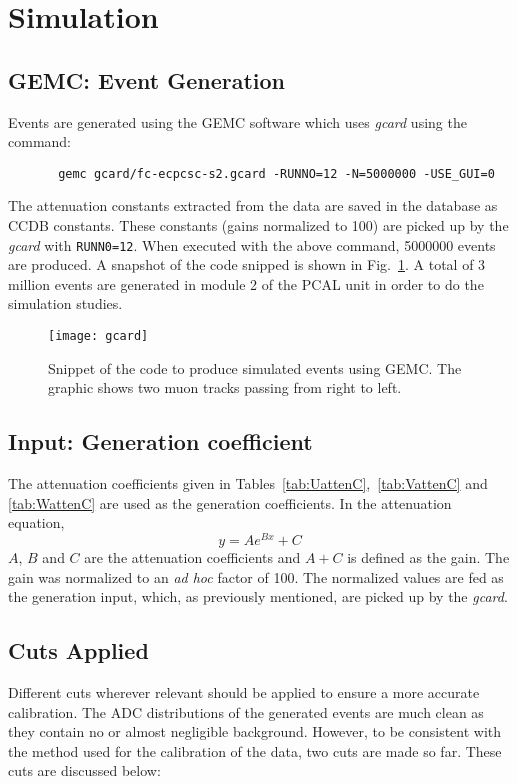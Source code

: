 \section{Simulation}
\FloatBarrier
\subsection{GEMC: Event Generation}
Events are generated using the GEMC software which uses \textit{gcard} using the command:
\begin{verbatim}
       gemc gcard/fc-ecpcsc-s2.gcard -RUNNO=12 -N=5000000 -USE_GUI=0
\end{verbatim}
The attenuation constants extracted from the data are saved in the database as CCDB constants. These constants 
(gains normalized to 100) are picked up by the \textit{gcard} with \texttt{RUNN0=12}. When executed with the above command, 5000000 events
are produced. A snapshot of the code snipped is shown in Fig.~\ref{fig:gcard}. A total of 3 million events are
generated in module 2 of the PCAL unit in order to do the simulation studies.

\begin{figure}[h]
    \centering
    \texttt{[image: gcard]}
    \caption{Snippet of the code to produce simulated events using GEMC. The graphic shows two muon tracks passing from 
    right to left.}
    \label{fig:gcard}
\end{figure}
\FloatBarrier

\FloatBarrier
\subsection{Input: Generation coefficient}
The attenuation coefficients given in Tables~\ref{tab:UattenC},~\ref{tab:VattenC} and \ref{tab:WattenC} are used as the generation
coefficients. In the attenuation equation,
\begin{equation}
y = A e^{Bx} + C
\label{eq:attn}
\end{equation}
$A$, $B$ and $C$ are the attenuation coefficients and $A+C$ is defined as the gain. The gain was normalized to an \textit{ad hoc}
factor of 100. The normalized values are fed as the generation input, which, as previously mentioned, are picked up by the
\textit{gcard}.
\FloatBarrier

\FloatBarrier
\subsection{Cuts Applied}
Different cuts wherever relevant should be applied to ensure a more accurate calibration. The ADC distributions of the 
generated events are much clean as they contain no or almost negligible background. However, to be consistent with the method
used for the calibration of the data, two cuts are made so far. These cuts are discussed below:


